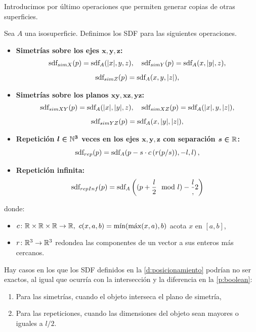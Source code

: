 Introducimos por último operaciones que permiten generar copias de otras superficies.
\begin{definicion}\label{d:posicionamiento}
    Sea $A$ una isosuperficie. Definimos los SDF para las siguientes operaciones.
    \begin{itemize}
        \item \textbf{Simetrías sobre los ejes $\boldsymbol{x,y,z}$:}
        \begin{gather*}
            \text{sdf}_{simX}(p) = \text{sdf}_{A}(\vert x\vert, y, z),\quad \text{sdf}_{simY}(p) = \text{sdf}_{A}(x, \vert y\vert,  z),\\[5pt] \text{sdf}_{simZ}(p) = \text{sdf}_{A}(x,y,\vert z\vert),
        \end{gather*}
        \item \textbf{Simetrías sobre los planos $\boldsymbol{xy,xz,yz}$:}
        \begin{gather*}
            \text{sdf}_{simXY}(p) = \text{sdf}_{A}(\vert x\vert, \vert y\vert, z),\quad \text{sdf}_{simXZ}(p) = \text{sdf}_{A}(\vert x\vert, y,  \vert z\vert),\\[5pt]\text{sdf}_{simYZ}(p) = \text{sdf}_{A}(x,\vert y\vert ,\vert z\vert),
        \end{gather*}
        \item \textbf{Repetición $\boldsymbol{l\in \mathbb{N}^3}$ veces en los ejes $\boldsymbol{x,y,z}$ con separación $\boldsymbol{s\in\mathbb{R}}$:} 
        \begin{equation*}
            \text{sdf}_{rep}(p) = \text{sdf}_{A}(p - s\cdot c\left(r(p/s)), -l, l\right),
        \end{equation*}
        \item \textbf{Repetición infinita:}
        \begin{equation*}
            \text{sdf}_{repInf}(p) = \text{sdf}_{A}\left((p+\frac{l}{2}\mod l )- \frac{l},{2}\right)
        \end{equation*}
    \end{itemize}
    donde:
    \begin{itemize}
        \item $c\colon \R\times\R\times\R\to \R,\ c(x,a,b) = \Min(\Max(x, a), b)$ acota $x$ en $[a,b]$,
        \item $r\colon \mathbb{R}^3 \to \mathbb{R}^3$ redondea las componentes de un vector a sus enteros más cercanos.
    \end{itemize}
\end{definicion}
\begin{observacion}
    Hay casos en los que los SDF definidos en la \autoref{d:posicionamiento} podrían no ser exactos, al igual que ocurría con la intersección y la diferencia en la \autoref{p:boolean}:
    \begin{enumerate}
        \item Para las simetrías, cuando el objeto interseca el plano de simetría,
        \item Para las repeticiones, cuando las dimensiones del objeto sean mayores o iguales a $l/2$.
    \end{enumerate}
\end{observacion}

